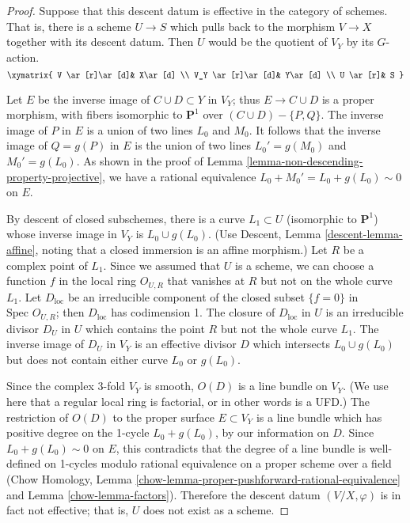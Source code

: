 \begin{proof}
\medskip\noindent
Suppose that this descent datum is effective in the category
of schemes. That is, there is a scheme $U\to S$
which pulls back to the morphism $V\to X$ together
with its descent datum. Then $U$ would be the quotient
of $V_Y$ by its $G$-action.
$$
\xymatrix{
V \ar[r]\ar[d]&  X\ar[d] \\
V_Y \ar[r]\ar[d]& Y\ar[d] \\
U \ar[r]& S
}
$$

\medskip\noindent
Let $E$ be the inverse image of $C\cup D\subset Y$ in $V_Y$;
thus $E\rightarrow C\cup D$ is a proper morphism, with fibers
isomorphic to ${\mathbf P}^1$ over $(C\cup D)-\{P,Q\}$.
The inverse image of $P$ in $E$ is a union of two lines $L_0$
and $M_0$. It follows that the inverse image of $Q=g(P)$ in $E$
is the union of two lines $L_0'=g(M_0)$ and $M_0'=g(L_0)$.
As shown in the proof
of Lemma \ref{lemma-non-descending-property-projective},
we have a rational equivalence $L_0+M_0'=L_0+g(L_0)\sim 0$ on $E$.

\medskip\noindent
By descent of closed subschemes, there is a curve $L_1\subset U$
(isomorphic to ${\mathbf P}^1$)
whose inverse image in $V_Y$ is $L_0\cup g(L_0)$. (Use Descent, Lemma
\ref{descent-lemma-affine}, noting that a closed immersion is an affine
morphism.)
Let $R$ be a complex point of $L_1$. Since
we assumed that $U$ is a scheme, we can choose a function
$f$ in the local ring $O_{U,R}$ that vanishes at $R$ but not
on the whole curve $L_1$. Let $D_{\text{loc}}$ be an irreducible component
of the closed subset $\{ f=0\}$ in $\text{Spec }O_{U,R}$; then
$D_{\text{loc}}$ has codimension 1.
The closure of $D_{\text{loc}}$ in $U$ is an irreducible divisor $D_U$
in $U$ which contains the point $R$ but not the whole curve $L_1$.
The inverse image of $D_U$ in $V_Y$ is an effective divisor $D$
which intersects $L_0\cup g(L_0)$ but does not contain either
curve $L_0$ or $g(L_0)$.

\medskip\noindent
Since the complex 3-fold $V_Y$ is smooth, $O(D)$ is a line
bundle on $V_Y$. (We use here that a regular local ring is factorial,
or in other words is a UFD.)
The restriction of $O(D)$ to the proper surface
$E\subset V_Y$ is a line bundle which has positive degree on the 1-cycle
$L_0+g(L_0)$, by our information on $D$. Since
$L_0+g(L_0)\sim 0$ on $E$, this contradicts 
that the degree of a line bundle is well-defined
on 1-cycles modulo rational equivalence on a proper scheme
over a field (Chow Homology,
Lemma \ref{chow-lemma-proper-pushforward-rational-equivalence}
and Lemma \ref{chow-lemma-factors}). Therefore the descent datum
$(V/X,\varphi)$ is in fact not effective; that is, $U$ does not exist
as a scheme.
\end{proof}

